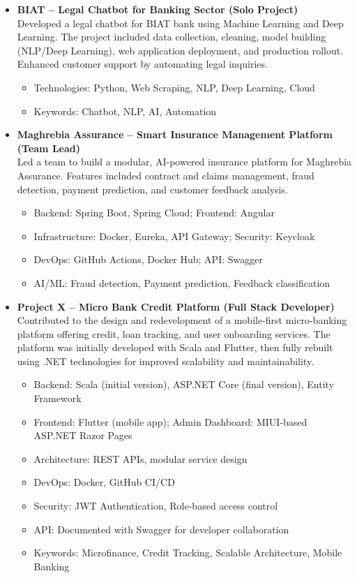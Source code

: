 \documentclass[paper=a4,fontsize=11pt]{scrartcl}
\begin{document}
\begin{itemize}
    \item \textbf{BIAT – Legal Chatbot for Banking Sector (Solo Project)} \\ %
    Developed a legal chatbot for BIAT bank using Machine Learning and Deep Learning. The project included data collection, cleaning, model building (NLP/Deep Learning), web application deployment, and production rollout. Enhanced customer support by automating legal inquiries.
    \begin{itemize}
        \item Technologies: Python, Web Scraping, NLP, Deep Learning, Cloud
        \item Keywords: Chatbot, NLP, AI, Automation
    \end{itemize}

    \item \textbf{Maghrebia Assurance – Smart Insurance Management Platform (Team Lead)} \\%
    Led a team to build a modular, AI-powered insurance platform for Maghrebia Assurance. Features included contract and claims management, fraud detection, payment prediction, and customer feedback analysis.
    \begin{itemize}
        \item Backend: Spring Boot, Spring Cloud; Frontend: Angular
        \item Infrastructure: Docker, Eureka, API Gateway; Security: Keycloak
        \item DevOps: GitHub Actions, Docker Hub; API: Swagger
        \item AI/ML: Fraud detection, Payment prediction, Feedback classification
    \end{itemize}
    \item \textbf{Project X – Micro Bank Credit Platform (Full Stack Developer)}\\ %
Contributed to the design and redevelopment of a mobile-first micro-banking platform offering credit, loan tracking, and user onboarding services. The platform was initially developed with Scala and Flutter, then fully rebuilt using .NET technologies for improved scalability and maintainability.
\begin{itemize}
    \item Backend: Scala (initial version), ASP.NET Core (final version), Entity Framework
    \item Frontend: Flutter (mobile app); Admin Dashboard: MIUI-based ASP.NET Razor Pages
    \item Architecture: REST APIs, modular service design
    \item DevOps: Docker, GitHub CI/CD
    \item Security: JWT Authentication, Role-based access control
    \item API: Documented with Swagger for developer collaboration
    \item Keywords: Microfinance, Credit Tracking, Scalable Architecture, Mobile Banking
\end{itemize}


\end{itemize}
\end{document}
